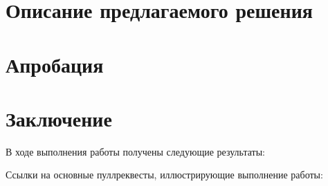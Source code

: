\documentclass[a4paper]{article}
\begin{document}
\section{Описание предлагаемого решения}

\begin{itemize}
\end{itemize}

\section{Апробация}

\section{Заключение}

В ходе выполнения работы получены следующие результаты:
\begin{itemize}
\end{itemize}


Ссылки на основные пуллреквесты, иллюстрирующие выполнение работы:
\begin{itemize}
\end{itemize}
\end{document}
